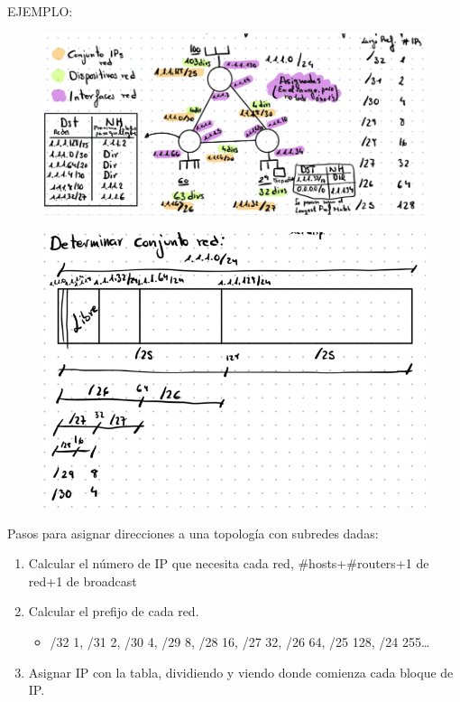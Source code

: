 \documentclass[12pt, twoside, openright]{report} %
\begin{document}
 
    EJEMPLO:
	\begin{figure}[H]
		{\includegraphics[scale=.3]{Untitled 30.png}}
	\end{figure}
    \begin{figure}[H]
		{\includegraphics[scale=.3]{Untitled 31.png}}
	\end{figure}
  
    Pasos para asignar direcciones a una topología con subredes dadas:

    \begin{enumerate}
    \def\labelenumi{\arabic{enumi}.}
    \item
      Calcular el número de IP que necesita cada red,
      \#hosts+\#routers+1 de red+1 de broadcast
    \item
      Calcular el prefijo de cada red.

      \begin{itemize}
      \item
        /32 1, /31 2, /30 4, /29 8, /28 16, /27 32, /26 64, /25 128, /24
        255\ldots{}
      \end{itemize}
    \item
      Asignar IP con la tabla, dividiendo y viendo donde comienza cada
      bloque de IP.
    \end{enumerate}
  
\end{document}
